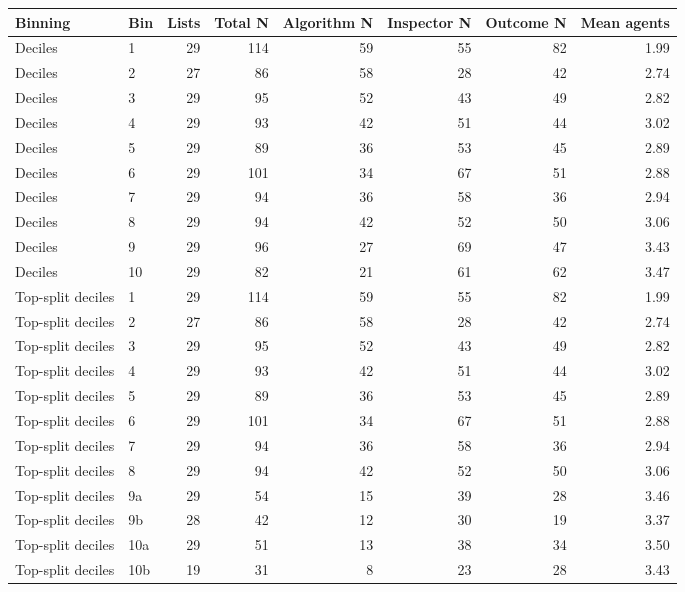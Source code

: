 \begin{tabular}{llrrrrrr}
\toprule
Binning & Bin & Lists & Total N & Algorithm N & Inspector N & Outcome N & Mean agents \\
\midrule
Deciles & 1 & 29 & 114 & 59 & 55 & 82 &  1.99 \\
Deciles & 2 & 27 & 86 & 58 & 28 & 42 &  2.74 \\
Deciles & 3 & 29 & 95 & 52 & 43 & 49 &  2.82 \\
Deciles & 4 & 29 & 93 & 42 & 51 & 44 &  3.02 \\
Deciles & 5 & 29 & 89 & 36 & 53 & 45 &  2.89 \\
Deciles & 6 & 29 & 101 & 34 & 67 & 51 &  2.88 \\
Deciles & 7 & 29 & 94 & 36 & 58 & 36 &  2.94 \\
Deciles & 8 & 29 & 94 & 42 & 52 & 50 &  3.06 \\
Deciles & 9 & 29 & 96 & 27 & 69 & 47 &  3.43 \\
Deciles & 10 & 29 & 82 & 21 & 61 & 62 &  3.47 \\
Top-split deciles & 1 & 29 & 114 & 59 & 55 & 82 &  1.99 \\
Top-split deciles & 2 & 27 & 86 & 58 & 28 & 42 &  2.74 \\
Top-split deciles & 3 & 29 & 95 & 52 & 43 & 49 &  2.82 \\
Top-split deciles & 4 & 29 & 93 & 42 & 51 & 44 &  3.02 \\
Top-split deciles & 5 & 29 & 89 & 36 & 53 & 45 &  2.89 \\
Top-split deciles & 6 & 29 & 101 & 34 & 67 & 51 &  2.88 \\
Top-split deciles & 7 & 29 & 94 & 36 & 58 & 36 &  2.94 \\
Top-split deciles & 8 & 29 & 94 & 42 & 52 & 50 &  3.06 \\
Top-split deciles & 9a & 29 & 54 & 15 & 39 & 28 &  3.46 \\
Top-split deciles & 9b & 28 & 42 & 12 & 30 & 19 &  3.37 \\
Top-split deciles & 10a & 29 & 51 & 13 & 38 & 34 &  3.50 \\
Top-split deciles & 10b & 19 & 31 & 8 & 23 & 28 &  3.43 \\
\bottomrule
\end{tabular}
